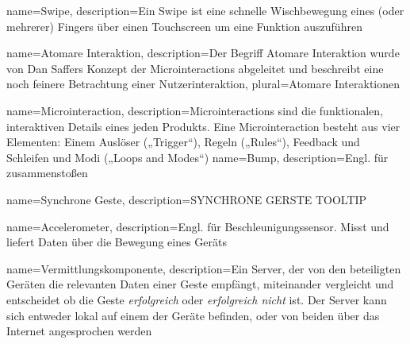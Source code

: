 {
    name=Swipe,
    description={Ein Swipe ist eine schnelle Wischbewegung eines (oder 				mehrerer) Fingers über einen Touchscreen um eine Funktion auszuführen}
}

{
    name=Atomare Interaktion,
    description={Der Begriff Atomare Interaktion wurde von Dan Saffers Konzept 		der Microinteractions abgeleitet und beschreibt eine noch feinere 				Betrachtung einer Nutzerinteraktion},
    plural={Atomare Interaktionen}
}

{
    name=Microinteraction,
    description={Microinteractions sind die funktionalen, interaktiven Details 		eines jeden Produkts. Eine Microinteraction besteht aus vier Elementen: 		Einem Auslöser („Trigger“), Regeln („Rules“), Feedback und Schleifen und 		Modi („Loops and Modes“)}
}
{
	name=Bump,
	description={Engl. für zusammenstoßen}
}

{
	name=Synchrone Geste,
	description={SYNCHRONE GERSTE TOOLTIP}
}

{
	name=Accelerometer,
	description={Engl. für Beschleunigungssensor. Misst und liefert Daten 			über die Bewegung eines Geräts}
}

{
	name=Vermittlungskomponente,
	description={Ein Server, der von den beteiligten Geräten die relevanten 		Daten einer Geste empfängt, miteinander vergleicht und entscheidet ob die 	Geste \textit{erfolgreich} oder \textit{erfolgreich nicht} ist. Der 			Server kann sich entweder lokal auf einem der Geräte befinden, oder von 		beiden über das Internet angesprochen werden}
}